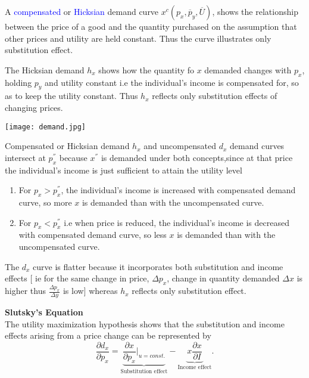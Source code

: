 \documentclass{tufte-handout}
\begin{document}
\textbullet A \textcolor{blue}{compensated} or \textcolor{blue}{Hicksian} demand curve  $x^c(p_x,\overline{p}_y,\overline{U})$, shows the relationship between the price of a good and the quantity purchased on the assumption that other prices and utility are held constant. Thus the curve illustrates only substitution effect.



The Hicksian demand $h_x$ shows how the quantity fo  $x$ demanded changes with  $p_x$, holding  $p_y$ and utility constant i.e the individual's income is compensated for, so as to keep the utility constant. Thus  $h_x$ reflects only substitution effects of changing prices.



\begin{marginfigure} %
    \texttt{[image: demand.jpg]}
\end{marginfigure}
Compensated or Hicksian demand $h_x$ and uncompensated  $d_x$ demand curves intersect at  $p_x^{''}$ because  $x^{''}$ is demanded under both concepts,since at that price the individual's income is just sufficient to attain the utility level
\begin{enumerate}
	\item For $p_x > p_x^{''}$, the individual's income is increased with compensated demand curve, so  more $x$ is demanded than with the uncompensated curve. 
	\item For $p_x < p_x^{''}$ i.e when price is reduced, the individual's income is decreased with compensated demand curve, so less  $x$ is demanded than with the uncompensated curve.
\end{enumerate}
The $d_x$ curve is flatter because it incorporates both substitution and income effects [ ie for the same change in price, $\Delta p_x$, change in quantity demanded $\Delta x$ is higher thus  
$\frac{\Delta p_x}{\Delta y} $ is low]  whereas  $h_x$ reflects only substitution effect.





\clearpage

\textbf{\large{\centering Slutsky's Equation}} \\ 
The utility maximization hypothesis shows that the substitution and income effects arising from a price change can be represented by
\[
		\frac{\partial d_x}{\partial p_x} =
\underbrace{\frac{\partial x}{\partial p_x} \Big|_{u = const.}}_{\text{Substitution effect}} 
- \underbrace{x \frac{\partial x}{\partial I}}_{\text{Income effect}}
.\] 
\end{document}
